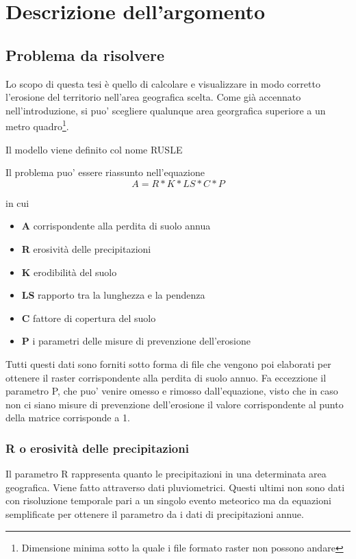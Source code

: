 
\chapter{Descrizione dell'argomento}
\label{cap:descrizione}
\section{Problema da risolvere}
\label{problemadarisolvere}
Lo scopo di questa tesi è quello di calcolare e visualizzare in modo corretto l'erosione del territorio nell'area geografica scelta. Come già accennato nell'introduzione, si puo' scegliere qualunque area georgrafica superiore a un metro quadro\footnote{Dimensione minima sotto la quale i file formato raster non possono andare}.

Il modello viene definito col nome RUSLE

Il problema puo' essere riassunto nell'equazione
\begin{equation} \label{eq:main}
A = R * K * LS * C * P
\end{equation}

in cui
\begin{itemize}
	\item \textbf{A} corrispondente alla perdita di suolo annua
	\item \textbf{R} erosività delle precipitazioni
	\item \textbf{K} erodibilità del suolo
	\item \textbf{LS} rapporto tra la lunghezza e la pendenza
	\item \textbf{C} fattore di copertura del suolo
	\item \textbf{P} i parametri delle misure di prevenzione dell'erosione
\end{itemize}

Tutti questi dati sono forniti sotto forma di file che vengono poi elaborati per ottenere il raster corrispondente alla perdita di suolo annuo. Fa eccezzione il parametro P, che puo' venire omesso e rimosso dall'equazione, visto che in caso non ci siano misure di prevenzione dell'erosione il valore corrispondente al punto della matrice corrisponde a 1.

\subsection{R o erosività delle precipitazioni}
Il parametro R rappresenta quanto le precipitazioni in una determinata area geografica. Viene fatto attraverso dati pluviometrici. Questi ultimi non sono dati con risoluzione temporale pari a un singolo evento meteorico ma da equazioni semplificate per ottenere il parametro da i dati di precipitazioni annue.

